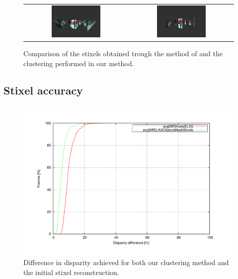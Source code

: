 \begin{figure}[h!]
\begin{tabular}{cc}
\includegraphics[width=0.49\textwidth]{stixelsDetection}\label{fig:cp04_stixels_detection} &
\includegraphics[width=0.49\textwidth]{obstacleDetection}\label{fig:cp04_obstacle_detection}
\end{tabular}
\caption{Comparison of the stixels obtained trough the method of \cite{benenson2012pedestrian} and the clustering performed in our method.}\label{fig:cp04_clustering_comparison}
\end{figure}

\subsection{Stixel accuracy}\label{ch:chapter04_02_02}

\begin{figure}[h!]
\centering
\includegraphics[trim=50 40 80 60,clip]{disparity}
\caption{Difference in disparity achieved for both our clustering method and the initial stixel reconstruction.}\label{fig:cp04_disparity_comparison}
\end{figure}

